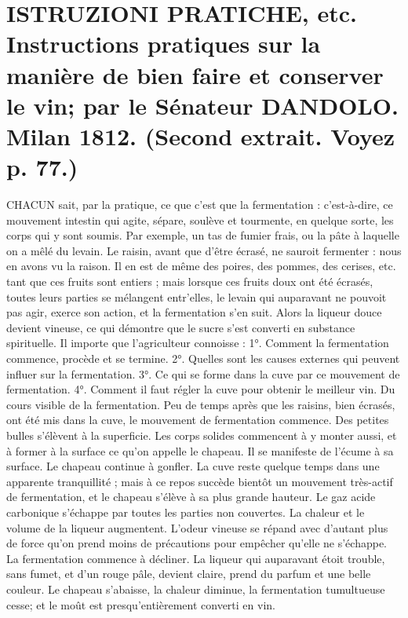 \setcounter{page}{137} \section{ISTRUZIONI PRATICHE, etc. Instructions pratiques sur la manière de bien faire et conserver le vin; par le Sénateur DANDOLO. Milan 1812. \large{(Second extrait. Voyez p. 77.)}}

CHACUN sait, par la pratique, ce que c'est que la fermentation : c'est-à-dire, ce mouvement intestin qui agite, sépare, soulève et tourmente, en quelque sorte, les corps qui y sont soumis. Par exemple, un tas de fumier frais, ou la pâte à laquelle on a mêlé du levain.
Le raisin, avant que d'être écrasé, ne sauroit fermenter : nous en avons vu la raison. Il en est de même des poires, des pommes, des cerises, etc. tant que ces fruits sont entiers ; mais lorsque ces fruits doux ont été écrasés, toutes leurs parties se mélangent entr'elles, le levain qui auparavant ne pouvoit pas agir, exerce son action, et la fermentation s'en suit. Alors la liqueur douce\setcounter{page}{138} devient vineuse, ce qui démontre que le sucre s'est converti en substance spirituelle.
Il importe que l'agriculteur connoisse :
1°. Comment la fermentation commence, procède et se termine.
2°. Quelles sont les causes externes qui peuvent influer sur la fermentation.
3°. Ce qui se forme dans la cuve par ce mouvement de fermentation.
4°. Comment il faut régler la cuve pour obtenir le meilleur vin.
Du cours visible de la fermentation.
Peu de temps après que les raisins, bien écrasés, ont été mis dans la cuve, le mouvement de fermentation commence.
Des petites bulles s'élèvent à la superficie.
Les corps solides commencent à y monter aussi, et à former à la surface ce qu'on appelle le chapeau.
Il se manifeste de l'écume à sa surface.
Le chapeau continue à gonfler.
La cuve reste quelque temps dans une apparente tranquillité ; mais à ce repos succède bientôt un mouvement très-actif de fermentation, et le chapeau s'élève à sa plus grande hauteur.
Le gaz acide carbonique s'échappe par toutes les parties non couvertes. La chaleur\setcounter{page}{139} et le volume de la liqueur augmentent. L'odeur vineuse se répand avec d'autant plus de force qu'on prend moins de précautions pour empêcher qu'elle ne s'échappe. La fermentation commence à décliner. La liqueur qui auparavant étoit trouble, sans fumet, et d'un rouge pâle, devient claire, prend du parfum et une belle couleur. Le chapeau s'abaisse, la chaleur diminue, la fermentation tumultueuse cesse; et le moût est presqu'entièrement converti en vin.
